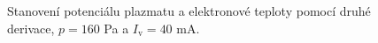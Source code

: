 \documentclass[a4paper,12pt]{article}
\begin{document}
\begin{figure}[h]
	\centering
	\begin{subfigure}[b]{.49\textwidth}
		\centering
	\end{subfigure}
	\begin{subfigure}[b]{.49\textwidth}
		\centering
	\end{subfigure}
	\caption{Stanovení potenciálu plazmatu a elektronové teploty pomocí druhé 
	derivace, $p = 160$ 
	\si{\pascal} a 
		$I_\text{v} = 40$ \si{\milli\ampere}.}
	\label{data0sec}
\end{figure}
\end{document}
